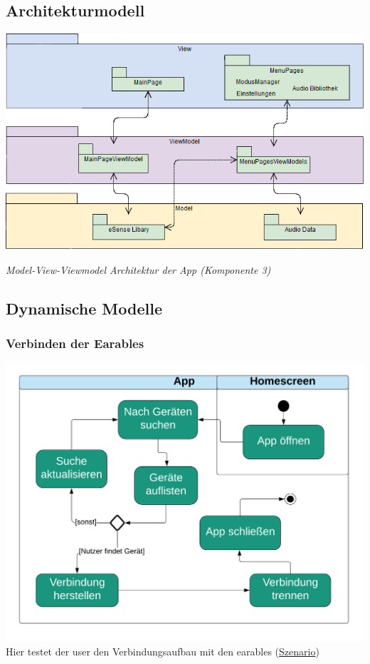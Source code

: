 \documentclass[../pflichtenheft.tex]{subfiles}
\begin{document}
	\subsection{Architekturmodell}
		\vspace{10mm}
		\includegraphics[page=1,width=400pt,keepaspectratio]{../graphics/UML/eSensePackageDiagram.png}
		\begin{center}
			\textit{Model-View-Viewmodel Architektur der App (Komponente 3)}
		\end{center}
		\subsection{Dynamische Modelle}
		\subsubsection{Verbinden der Earables}
		\label{sec:verbinden}
			\includegraphics[page=1,width=400pt,keepaspectratio]{../graphics/UML/Verbinden_der_Earables.png}
			Hier testet der \Gls{user} den Verbindungsaufbau mit den \Gls{earable}s (\hyperref[sec:verbindenS]{Szenario})
\end{document}
